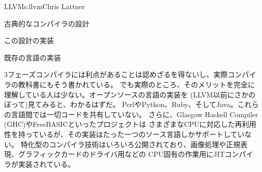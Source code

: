 \begin{aosachapter}{LLVM}{s:llvm}{Chris Lattner}
\begin{aosasect1}{古典的なコンパイラの設計}
\begin{aosasect2}{この設計の実装}
\end{aosasect2}

\end{aosasect1}

\begin{aosasect1}{既存の言語の実装}

3フェーズコンパイラには利点があることは認めざるを得ないし、実際コンパイラの教科書にもそう書かれている。
でも実際のところ、そのメリットを完全に理解している人は少ない。オープンソースの言語の実装を
(LLVM以前にさかのぼって)見てみると、わかるはずだ。
PerlやPython、Ruby、そしてJava。これらの言語間では一切コードを共有していない。
さらに、Glasgow Haskell Compiler (GHC)やFreeBASICといったプロジェクトは
さまざまなCPUに対応した再利用性を持っているが、その実装はたった一つのソース言語しかサポートしていない。
特化型のコンパイラ技術はいろいろ公開されており、画像処理や正規表現、グラフィックカードのドライバ用などの
CPU固有の作業用にJITコンパイラが実装されている。


\end{aosasect1}
\end{aosachapter}
